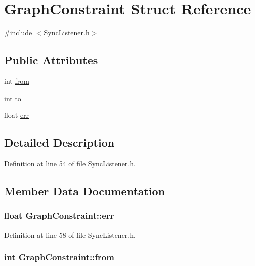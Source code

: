 \hypertarget{structGraphConstraint}{\section{\-Graph\-Constraint \-Struct \-Reference}
\label{structGraphConstraint}
}


{\ttfamily \#include $<$\-Sync\-Listener.\-h$>$}

\subsection*{\-Public \-Attributes}
\begin{DoxyCompactItemize}
\item 
int \hyperlink{structGraphConstraint_a6aa031743203b4691eb90397e6b2b27d}{from}
\item 
int \hyperlink{structGraphConstraint_aacbe0ea6278c9005bec666c1df276912}{to}
\item 
float \hyperlink{structGraphConstraint_a3d6dbef26111f030919673ba40fed465}{err}
\end{DoxyCompactItemize}


\subsection{\-Detailed \-Description}


\-Definition at line 54 of file \-Sync\-Listener.\-h.



\subsection{\-Member \-Data \-Documentation}
\hypertarget{structGraphConstraint_a3d6dbef26111f030919673ba40fed465}{
\subsubsection[{err}]{\setlength{\rightskip}{0pt plus 5cm}float {\bf \-Graph\-Constraint\-::err}}}\label{structGraphConstraint_a3d6dbef26111f030919673ba40fed465}


\-Definition at line 58 of file \-Sync\-Listener.\-h.

\hypertarget{structGraphConstraint_a6aa031743203b4691eb90397e6b2b27d}{
\subsubsection[{from}]{\setlength{\rightskip}{0pt plus 5cm}int {\bf \-Graph\-Constraint\-::from}}}\label{structGraphConstraint_a6aa031743203b4691eb90397e6b2b27d}


